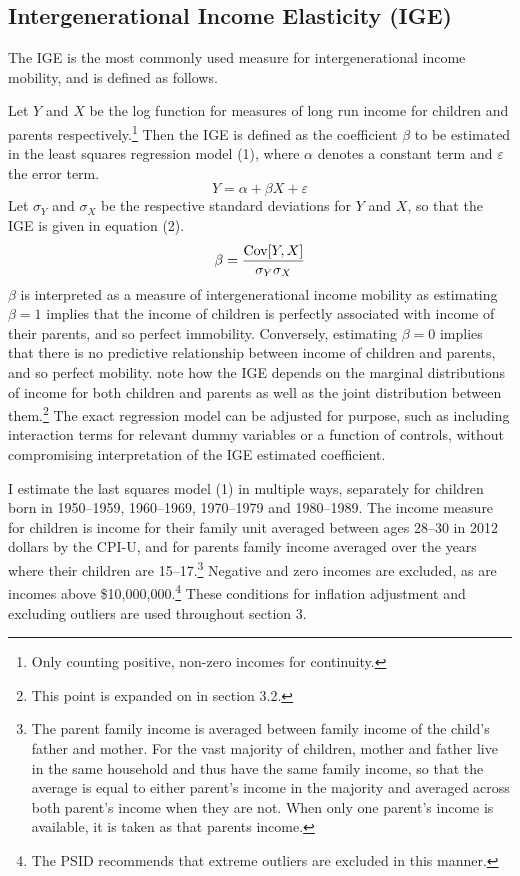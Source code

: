 \documentclass[notitlepage,12pt]{article}
\begin{document}
\subsection{Intergenerational Income Elasticity (IGE)}

The IGE is the most commonly used measure for intergenerational income mobility, and is defined as follows.

Let $Y$ and $X$ be the log function for measures of long run income for children and parents respectively.\footnote{Only counting positive, non-zero incomes for continuity.}  Then the IGE is defined as the coefficient $\beta$ to be estimated in the least squares regression model (1), where $\alpha$ denotes a constant term and $\varepsilon$ the error term.
\begin{equation}
Y=\alpha + \beta X + \varepsilon
\end{equation}
Let $\sigma_Y$ and $\sigma_X$ be the respective standard deviations for $Y$ and $X$, so that the IGE is given in equation (2).
\begin{equation}
\beta = \frac{\textnormal{Cov} [Y, X]}{\sigma_Y \sigma_X}
\end{equation}
$\beta$ is interpreted as a measure of intergenerational income mobility as estimating $\beta=1$ implies that the income of children is perfectly associated with income of their parents, and so perfect immobility.  Conversely, estimating $\beta=0$ implies that there is no predictive relationship between income of children and parents, and so perfect mobility.  \cite{black2010recent} note how the IGE depends on the marginal distributions of income for both children and parents as well as the joint distribution between them.\footnote{This point is expanded on in section 3.2.}  The exact regression model can be adjusted for purpose, such as including interaction terms for relevant dummy variables or a function of controls, without compromising interpretation of the IGE estimated coefficient.

I estimate the last squares model (1) in multiple ways, separately for children born in 1950--1959, 1960--1969, 1970--1979 and 1980--1989.  The income measure for children is income for their family unit averaged between ages 28--30 in 2012 dollars by the CPI-U, and for parents family income averaged over the years where their children are 15--17.\footnote{The parent family income is averaged between family income of the child's father and mother.  For the vast majority of children, mother and father live in the same household and thus have the same family income, so that the average is equal to either parent's income in the majority and averaged across both parent's income when they are not.  When only one parent's income is available, it is taken as that parents income.}  Negative and zero incomes are excluded, as are incomes above \$10,000,000.\footnote{The PSID recommends that extreme outliers are excluded in this manner.}  These conditions for inflation adjustment and excluding outliers are used throughout section 3. 
\end{document}
